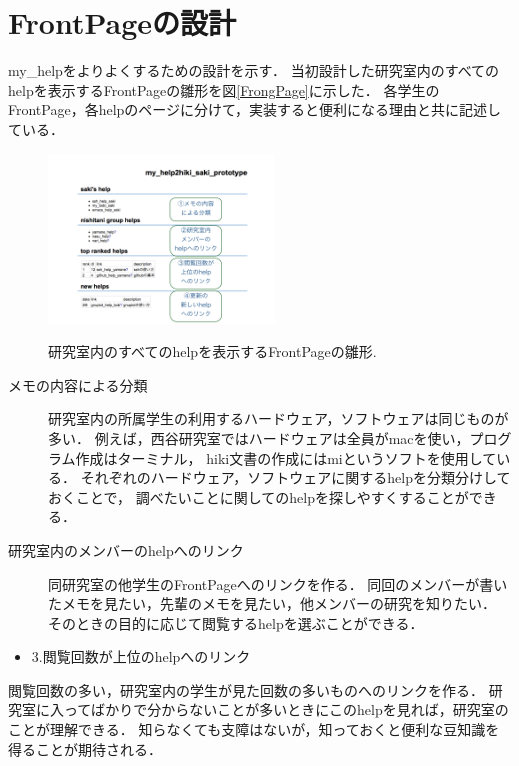 \section{FrontPageの設計}
my\_helpをよりよくするための設計を示す．
当初設計した研究室内のすべてのhelpを表示するFrontPageの雛形を図\ref{FrongPage}に示した．
各学生のFrontPage，各helpのページに分けて，実装すると便利になる理由と共に記述している．

\begin{figure}[htbp]
\begin{center}
\includegraphics[width=6.0cm,bb=0 0 600 800]{my_help2hiki_saki.014.png}
\caption{研究室内のすべてのhelpを表示するFrontPageの雛形.}
\label{FrongPage}
\label{default}\end{center}\end{figure}


\begin{description}
\item[メモの内容による分類] 研究室内の所属学生の利用するハードウェア，ソフトウェアは同じものが多い．
例えば，西谷研究室ではハードウェアは全員がmacを使い，プログラム作成はターミナル，
hiki文書の作成にはmiというソフトを使用している．
それぞれのハードウェア，ソフトウェアに関するhelpを分類分けしておくことで，
調べたいことに関してのhelpを探しやすくすることができる．
\item[研究室内のメンバーのhelpへのリンク]
同研究室の他学生のFrontPageへのリンクを作る．
同回のメンバーが書いたメモを見たい，先輩のメモを見たい，他メンバーの研究を知りたい．
そのときの目的に応じて閲覧するhelpを選ぶことができる．
\end{description}

\begin{itemize}
\item 3.閲覧回数が上位のhelpへのリンク
\end{itemize}
\begin{description}
\item 閲覧回数の多い，研究室内の学生が見た回数の多いものへのリンクを作る．
研究室に入ってばかりで分からないことが多いときにこのhelpを見れば，研究室のことが理解できる．
知らなくても支障はないが，知っておくと便利な豆知識を得ることが期待される．\\
\end{description}

